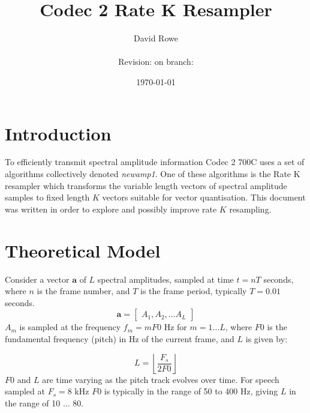 \documentclass{article}
\title{Codec 2 Rate K Resampler}
\author{David Rowe\\ \\ Revision: {\gitrevision} on branch: {\branch}}
\date{\today}
\begin{document}
\maketitle

\section{Introduction}

To efficiently transmit spectral amplitude information Codec 2 700C uses a set of algorithms collectively denoted \emph{newamp1}. One of these algorithms is the Rate K resampler which transforms the variable length vectors of spectral amplitude samples to fixed length $K$ vectors suitable for vector quantisation.  This document was written in order to explore and possibly improve rate $K$ resampling.

\section{Theoretical Model}

Consider a vector $\mathbf{a}$ of $L$ spectral amplitudes, sampled at time $t=nT$ seconds, where $n$ is the frame number, and $T$ is the frame period, typically $T=0.01$ seconds. 
\begin{equation}
\mathbf{a} = \begin{bmatrix} A_1, A_2, \ldots A_L \end{bmatrix} 
\end{equation}
$A_m$ is sampled at the frequency $f_m=mF0$ Hz for $m=1 \ldots L$, where $F0$ is the fundamental frequency (pitch) in Hz of the current frame, and $L$ is given by:

\begin{equation}
L=\left \lfloor \frac{F_s}{2F0} \right \rfloor
\end{equation}
$F0$ and $L$ are time varying as the pitch track evolves over time. For speech sampled at $F_s=8$ kHz $F0$ is typically in the range of 50 to 400 Hz, giving $L$ in the range of 10 $\ldots$ 80. \\
\end{document}
